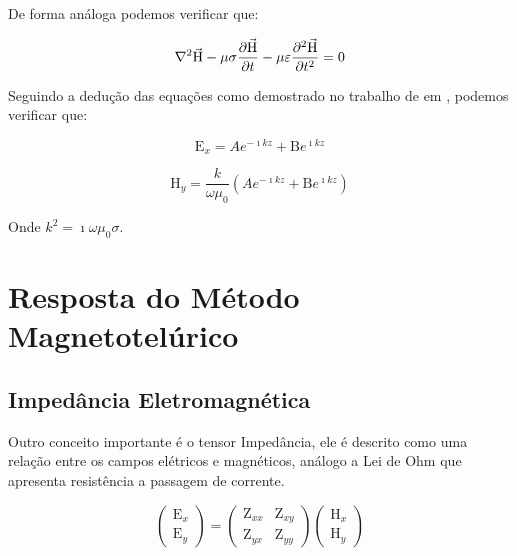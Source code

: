             De forma análoga podemos verificar que:
            
            \begin{equation}
             \nabla^2 \vec{\textrm{H}} - \mu \sigma \dfrac{\partial \vec{\textrm{H}}}{\partial t} - \mu \varepsilon \dfrac{\partial^2 \vec{\textrm{H}}}{\partial t^2} = 0
            \end{equation}

            Seguindo a dedução das equações como demostrado no trabalho de \citeauthor{didana2010} em \citeyearpar{didana2010}, podemos verificar que:
            
            \begin{equation}
            \label{Ex_AB}
             \textrm{E}_x = A e^{-\imath k z} + \textrm{B} e^{\imath k z}
            \end{equation}
            
            \begin{equation}
            \label{Hy_AB}
             \textrm{H}_y = \dfrac{k}{\omega \mu_0} (A e^{-\imath k z} + \textrm{B} e^{\imath k z})
            \end{equation}

            Onde $k^2 = \imath \omega \mu_0 \sigma$.

 
    
    
    
    \section{Resposta do Método Magnetotelúrico}
        \subsection{Impedância Eletromagnética}
        \label{subsec-Impedancia}
        Outro conceito importante é o tensor Impedância, ele é descrito como uma
	    relação entre os campos elétricos e magnéticos, análogo a Lei de Ohm \cite{eletromag8hayt}
	    que apresenta resistência a passagem de corrente.
	    
	    \begin{equation}
		\left (\begin{array}{c}
		 \textrm{E}_x\\
		 \textrm{E}_y
		\end{array}\right)
		=
		\left (\begin{array}{cc}
		 \textrm{Z}_{xx} & \textrm{Z}_{xy}\\
		 \textrm{Z}_{yx} & \textrm{Z}_{yy}
		\end{array}\right) \left (\begin{array}{c}
		 \textrm{H}_x\\
		 \textrm{H}_y
		\end{array}\right)
	    \end{equation}
	    
